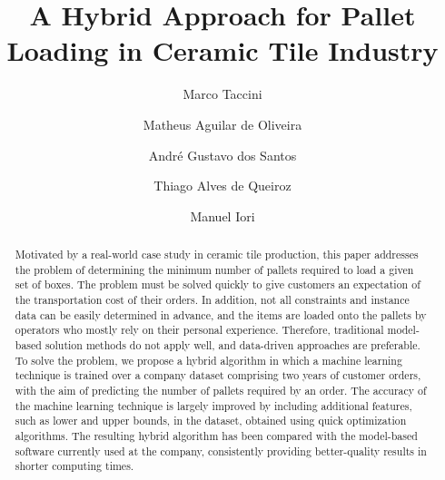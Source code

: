 \documentclass[runningheads]{llncs}
\newcommand{\rev}[1]{{#1}}
\begin{document}
\title{\rev{A Hybrid Approach for Pallet Loading in Ceramic Tile Industry}}

\author{Marco Taccini \and
Matheus Aguilar de Oliveira \and
André Gustavo dos Santos \and
Thiago Alves de Queiroz \and
Manuel Iori
}
%
%
%
\maketitle              %
%
\begin{abstract}

\rev{Motivated by a real-world case study in ceramic tile production, this paper addresses the problem of determining the minimum number of pallets required to load a given set of boxes. The problem must be solved quickly to give customers an expectation of the transportation cost of their orders. In addition, not all constraints and instance data can be easily determined in advance, and the items are loaded onto the pallets by operators who mostly rely on their personal experience. Therefore, traditional model-based solution methods do not apply well, and data-driven approaches are preferable. To solve the problem, we propose a hybrid algorithm in which a machine learning technique is trained over a company dataset comprising two years of customer orders, with the aim of predicting the number of pallets required by an order. The accuracy of the machine learning technique is largely improved by including additional features, such as lower and upper bounds, in the dataset, obtained using quick optimization algorithms. The resulting hybrid algorithm has been compared with the model-based software currently used at the company, consistently providing better-quality results in shorter computing times.}

\end{abstract}
\end{document}

